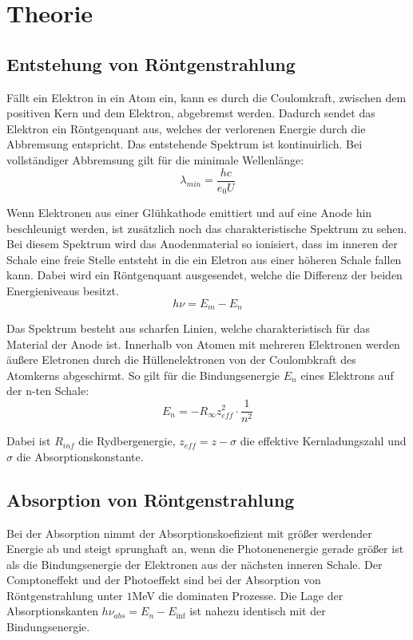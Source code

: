 \section{Theorie}
\label{sec:Theorie}

\cite{sample}

\subsection{Entstehung von Röntgenstrahlung}

Fällt ein Elektron in ein Atom ein, kann es durch die Coulomkraft, zwischen dem positiven Kern
und dem Elektron, abgebremst werden. Dadurch sendet das Elektron ein Röntgenquant  aus, welches der
verlorenen Energie durch die Abbremsung entspricht. Das entstehende Spektrum ist kontinuirlich.
Bei vollständiger Abbremsung gilt für die minimale Wellenlänge:
\begin{equation}
  \lambda_{min} = \frac{h c}{e_0 U}
\end{equation}

Wenn Elektronen aus einer Glühkathode emittiert und auf eine Anode hin beschleunigt werden, ist zusätzlich
noch das charakteristische Spektrum zu sehen. Bei diesem Spektrum wird das Anodenmaterial so ionisiert, dass im inneren
der Schale eine freie Stelle entsteht in die ein Eletron aus einer höheren Schale fallen kann. Dabei wird
ein Röntgenquant ausgesendet, welche die Differenz der beiden Energieniveaus besitzt.
\begin{equation}
  h \nu = E_m - E_n
\end{equation}

Das Spektrum besteht aus scharfen Linien, welche charakteristisch für das Material der Anode ist.
Innerhalb von Atomen mit mehreren Elektronen werden äußere Eletronen durch die Hüllenelektronen von
der Coulombkraft des Atomkerns abgeschirmt.
So gilt für die Bindungsenergie $E_n$ eines Elektrons auf der n-ten Schale:
\begin{equation}
  E_n = -R_{\infty} z_{eff}^2 \cdot \frac{1}{n^2}
\end{equation}

Dabei ist $R_{inf}$ die Rydbergenergie, $z_{eff} = z - \sigma$ die effektive Kernladungszahl und $\sigma$ die Absorptionskonstante.

\subsection{Absorption von Röntgenstrahlung}
Bei der Absorption nimmt der Absorptionskoefizient mit größer werdender Energie ab und steigt sprunghaft an, wenn
die Photonenenergie gerade größer ist als die Bindungsenergie der Elektronen aus der nächsten inneren Schale. Der
Comptoneffekt und der Photoeffekt sind bei der Absorption von Röntgenstrahlung unter $1$MeV die dominaten Prozesse.
Die Lage der Absorptionskanten $h \nu_{abs} = E_n - E_{\inf}$ ist nahezu identisch mit der Bindungsenergie.

